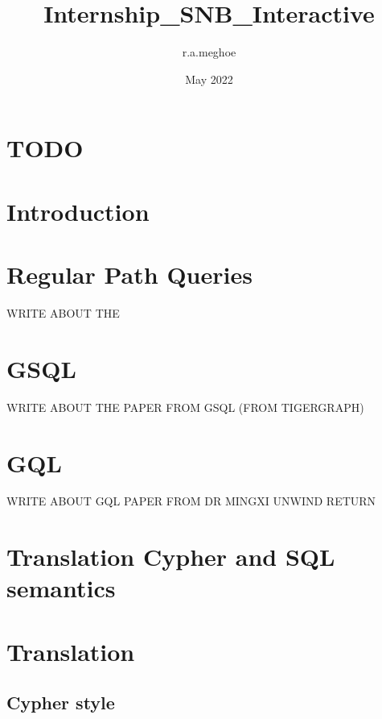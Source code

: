 \documentclass{article}
\title{Internship_SNB_Interactive}
\author{r.a.meghoe }
\date{May 2022}
\begin{document}
\section{TODO}

\section{Introduction}
\section{Regular Path Queries}
WRITE ABOUT THE 
\section{GSQL}
WRITE ABOUT THE PAPER FROM GSQL (FROM TIGERGRAPH)
\section{GQL}

WRITE ABOUT GQL PAPER FROM DR MINGXI
UNWIND
RETURN
\section{Translation Cypher and SQL semantics}
\section{Translation} 
\subsection{Cypher style}
























\end{document}
